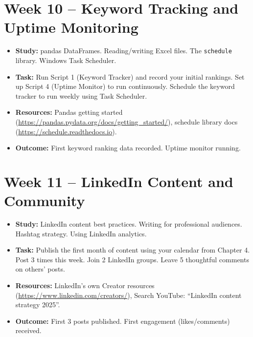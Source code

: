 \documentclass[12pt, a4paper]{book}
\begin{document}
\section{Week 10 -- Keyword Tracking and Uptime Monitoring}
\begin{itemize}[leftmargin=1.5em]
  \item \textbf{Study:} pandas DataFrames. Reading/writing Excel files. The \texttt{schedule} library.
        Windows Task Scheduler.
  \item \textbf{Task:} Run Script 1 (Keyword Tracker) and record your initial rankings.
        Set up Script 4 (Uptime Monitor) to run continuously.
        Schedule the keyword tracker to run weekly using Task Scheduler.
  \item \textbf{Resources:} Pandas getting started (\url{https://pandas.pydata.org/docs/getting\_started/}),
        schedule library docs (\url{https://schedule.readthedocs.io}).
  \item \textbf{Outcome:} First keyword ranking data recorded. Uptime monitor running.
\end{itemize}

\section{Week 11 -- LinkedIn Content and Community}
\begin{itemize}[leftmargin=1.5em]
  \item \textbf{Study:} LinkedIn content best practices. Writing for professional audiences.
        Hashtag strategy. Using LinkedIn analytics.
  \item \textbf{Task:} Publish the first month of content using your calendar from Chapter 4.
        Post 3 times this week. Join 2 LinkedIn groups. Leave 5 thoughtful comments on others' posts.
  \item \textbf{Resources:} LinkedIn's own Creator resources (\url{https://www.linkedin.com/creators/}),
        Search YouTube: ``LinkedIn content strategy 2025''.
  \item \textbf{Outcome:} First 3 posts published. First engagement (likes/comments) received.
\end{itemize}
\end{document}
